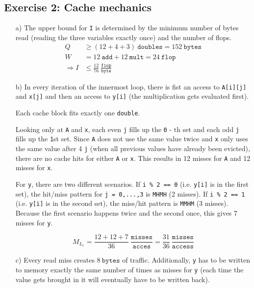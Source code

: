 \documentclass[11pt]{article}
\newcommand{\type}{~\mathtt}
\begin{document}
\subsection*{Exercise 2: Cache mechanics}
	\begin{itemize}
		\item[a)] The upper bound for \texttt{I} is determined by the minimum number of bytes read (reading the three variables exactly once) and the number of flops.
		\begin{align*}
			Q& \geq (12 + 4 + 3) \type{doubles} = 152 \type{bytes}\\
			W& = 12 \type{add} + 12 \type{mult} = 24 \type{flop}\\
			\Rightarrow I& \leq \frac{12}{76} \type{\frac{flop}{byte}}
		\end{align*}
		\item[b)] In every iteration of the innermost loop, there is fist an access to \texttt{A[i][j]} and \texttt{x[j]} and then an access to \texttt{y[i]} (the multiplication gets evaluated first).\par Each cache block fits exactly one \texttt{double}.\par
		Looking only at \texttt{A} and \texttt{x}, each even \texttt{j} fills up the \texttt{0} - th set and each odd \texttt{j} fills up the \texttt{1}st set. Since \texttt{A} does not use the same value twice and \texttt{x} only uses the same value after 4 \texttt{j} (when all previous values have already been evicted), there are no cache hits for either \texttt{A} or \texttt{x}. This results in 12 misses for \texttt{A} and 12 misses for \texttt{x}.\par
		For \texttt{y}, there are two different scenarios. If \texttt{i \% 2 == 0} (i.e. \texttt{y[i]} is in the first set), the hit/miss pattern for \texttt{j = 0,...,3} is \texttt{MHMH} (2 misses). If \texttt{i \% 2 == 1} (i.e. \texttt{y[i]} is in the second set), the miss/hit pattern is \texttt{MMHM} (3 misses). Because the first scenario happens twice and the second once, this gives 7 misses for \texttt{y}.\par
		\[ M_{L_1} = \frac{12 + 12 + 7}{36}\type{\frac{misses}{acces}} = \frac{31}{36}\type{\frac{misses}{access}} \]
		\item[c)] Every read miss creates $8 \type{bytes}$ of traffic. Additionally, \texttt{y} has to be written to memory exactly the same number of times as misses for \texttt{y} (each time the value gets brought in it will eventually have to be written back).\par

\end{itemize}
\end{document}
